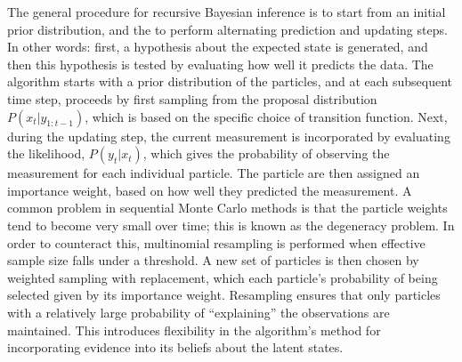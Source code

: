 \documentclass[english,floatsintext,man]{apa6}
\theoremstyle{definition}
\theoremstyle{definition}
\theoremstyle{remark}
\begin{document}
The general procedure for recursive Bayesian inference is to start from
an initial prior distribution, and the to perform alternating prediction
and updating steps. In other words: first, a hypothesis about the
expected state is generated, and then this hypothesis is tested by
evaluating how well it predicts the data. The algorithm starts with a
prior distribution of the particles, and at each subsequent time step,
proceeds by first sampling from the proposal distribution
\(P(x_t | y_{1:t-1})\), which is based on the specific choice of
transition function. Next, during the updating step, the current
measurement is incorporated by evaluating the likelihood,
\(P(y_t | x_t)\), which gives the probability of observing the
measurement for each individual particle. The particle are then assigned
an importance weight, based on how well they predicted the measurement.
A common problem in sequential Monte Carlo methods is that the particle
weights tend to become very small over time; this is known as the
degeneracy problem. In order to counteract this, multinomial resampling
is performed when effective sample size falls under a threshold. A new
set of particles is then chosen by weighted sampling with replacement,
which each particle's probability of being selected given by its
importance weight. Resampling ensures that only particles with a
relatively large probability of \enquote{explaining} the observations
are maintained. This introduces flexibility in the algorithm's method
for incorporating evidence into its beliefs about the latent states.
\end{document}
